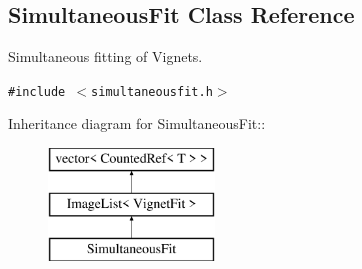 \subsection{Simultaneous\-Fit  Class Reference}
\label{class_simultaneousfit}
Simultaneous fitting of Vignets. 


{\tt \#include $<$simultaneousfit.h$>$}

Inheritance diagram for Simultaneous\-Fit::\begin{figure}[H]
\begin{center}
\leavevmode
\includegraphics[height=3cm]{class_simultaneousfit}
\end{center}
\end{figure}
